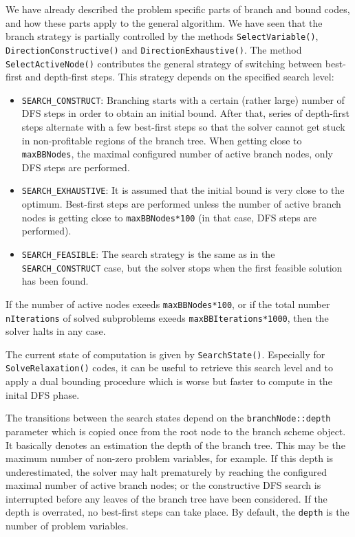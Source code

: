 \documentclass[a4paper,11pt,twoside]{book}
\begin{document}
\begin{multicols}{2}
We have already described the problem specific parts of branch and bound codes,
and how these parts apply to the general algorithm. We have seen that the
branch strategy is partially controlled by the methods \verb/SelectVariable()/,
\verb/DirectionConstructive()/ and \verb/DirectionExhaustive()/. The method
\verb/SelectActiveNode()/ contributes the general strategy of switching between
best-first and depth-first steps. This strategy depends on the specified search
level:
\begin{itemize}
\item \verb/SEARCH_CONSTRUCT/: Branching starts with a certain (rather large)
    number of DFS steps in order to obtain an initial bound. After that, series
    of depth-first steps alternate with a few best-first steps so that the
    solver cannot get stuck in non-profitable regions of the branch tree. When
    getting close to \verb/maxBBNodes/, the maximal configured number of active
    branch nodes, only DFS steps are performed.
\item \verb/SEARCH_EXHAUSTIVE/: It is assumed that the initial bound is very
    close to the optimum. Best-first steps are performed unless the number
    of active branch nodes is getting close to \verb/maxBBNodes*100/ (in that
    case, DFS steps are performed).
\item \verb/SEARCH_FEASIBLE/: The search strategy is the same as in the
    \verb/SEARCH_CONSTRUCT/ case, but the solver stops when the first feasible
    solution has been found.
\end{itemize}
If the number of active nodes exeeds \verb/maxBBNodes*100/, or if the total
number \verb/nIterations/ of solved subproblems exeeds
\verb/maxBBIterations*1000/, then the solver halts in any case.

The current state of computation is given by \verb/SearchState()/. Especially
for \verb/SolveRelaxation()/ codes, it can be useful to retrieve
this search level and to apply a dual bounding procedure which is worse but
faster to compute in the inital DFS phase.

The transitions between the search states depend on the \verb/branchNode::depth/
parameter which is copied once from the root node to the branch scheme object.
It basically denotes an estimation the depth of the branch tree. This may
be the maximum number of non-zero problem variables, for example. If this depth
is underestimated, the solver may halt prematurely by reaching the configured
maximal number of active branch nodes; or the constructive DFS search is
interrupted before any leaves of the branch tree have been considered. If the
depth is overrated, no best-first steps can take place. By default, the
\verb/depth/ is the number of problem variables.


\end{multicols}
\end{document}
